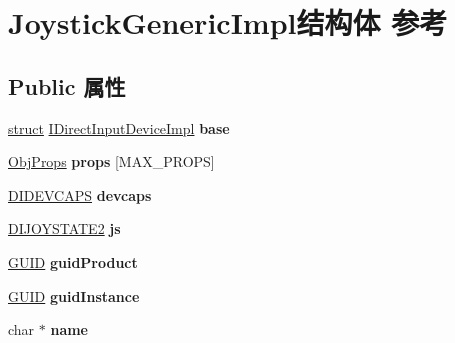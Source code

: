 \hypertarget{struct_joystick_generic_impl}{}\section{Joystick\+Generic\+Impl结构体 参考}
\label{struct_joystick_generic_impl}
\subsection*{Public 属性}
\begin{DoxyCompactItemize}
\item 
\mbox{\label{struct_joystick_generic_impl_a459b75b7ef6f4b6b266dfd2e19b19d2c}} 
\hyperlink{interfacestruct}{struct} \hyperlink{struct_i_direct_input_device_impl}{I\+Direct\+Input\+Device\+Impl} {\bfseries base}
\item 
\mbox{\label{struct_joystick_generic_impl_acd33e5481212f31b24c19337aa381942}} 
\hyperlink{struct_obj_props}{Obj\+Props} {\bfseries props} \mbox{[}M\+A\+X\+\_\+\+P\+R\+O\+PS\mbox{]}
\item 
\mbox{\label{struct_joystick_generic_impl_a67f3338eea734030729b46482a6a1353}} 
\hyperlink{struct_d_i_d_e_v_c_a_p_s}{D\+I\+D\+E\+V\+C\+A\+PS} {\bfseries devcaps}
\item 
\mbox{\label{struct_joystick_generic_impl_ade3e339688113d26008571932fe9434d}} 
\hyperlink{struct_d_i_j_o_y_s_t_a_t_e2}{D\+I\+J\+O\+Y\+S\+T\+A\+T\+E2} {\bfseries js}
\item 
\mbox{\label{struct_joystick_generic_impl_a68789ccd99db3b41dc126df4d7b84f93}} 
\hyperlink{interface_g_u_i_d}{G\+U\+ID} {\bfseries guid\+Product}
\item 
\mbox{\label{struct_joystick_generic_impl_af529982c0096274b667053800afc7c95}} 
\hyperlink{interface_g_u_i_d}{G\+U\+ID} {\bfseries guid\+Instance}
\item 
\mbox{\label{struct_joystick_generic_impl_a154af9a09db641eb6b29c9b76d65c130}} 
char $\ast$ {\bfseries name}
\item 

\end{DoxyCompactItemize}
